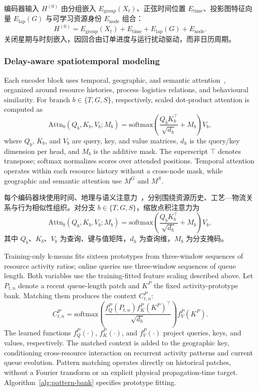 \documentclass[a4paper,fleqn]{cas-dc}
\newcommand{\zhpara}[1]{%
  \par\begingroup\small\color{black!72}\noindent #1\par\endgroup}
\begin{document}
\zhpara{编码器输入 $H^{(0)}$ 由分组嵌入 $E_{\mathrm{group}}(X_t)$、正弦时间位置 $E_{\mathrm{time}}$、投影图特征向量 $E_{\mathrm{lap}}(G)$ 与可学习资源身份 $E_{\mathrm{node}}$ 组合：
\begin{equation}
H^{(0)}=E_{\mathrm{group}}(X_t)+
E_{\mathrm{time}}+E_{\mathrm{lap}}(G)+E_{\mathrm{node}}.
\end{equation}
关闭星期与时刻嵌入，因回合由订单进度与运行扰动驱动，而非日历周期。}


\subsubsection{Delay-aware spatiotemporal modeling}

Each encoder block uses temporal, geographic, and semantic attention~\cite{jiang2023pdformer}, organized around resource histories, process--logistics relations, and behavioural similarity. For branch $b\in\{T,G,S\}$, respectively, scaled dot-product attention is computed as
\begin{equation}
\mathrm{Attn}_{b}(Q_b,K_b,V_b;M_b)
=\mathrm{softmax}\!\left(
\frac{Q_bK_b^\top}{\sqrt{d_h}}+M_b
\right)V_b ,
\end{equation}
where $Q_b$, $K_b$, and $V_b$ are query, key, and value matrices, $d_h$ is the query/key dimension per head, and $M_b$ is the additive mask. The superscript $\top$ denotes transpose; softmax normalizes scores over attended positions. Temporal attention operates within each resource history without a cross-node mask, while geographic and semantic attention use $M^G$ and $M^S$.

\zhpara{每个编码器块使用时间、地理与语义注意力~\cite{jiang2023pdformer}，分别围绕资源历史、工艺—物流关系与行为相似性组织。对分支 $b\in\{T,G,S\}$，缩放点积注意力为
\begin{equation}
\mathrm{Attn}_{b}(Q_b,K_b,V_b;M_b)
=\mathrm{softmax}\!\left(
\frac{Q_bK_b^\top}{\sqrt{d_h}}+M_b
\right)V_b ,
\end{equation}
其中 $Q_b$、$K_b$、$V_b$ 为查询、键与值矩阵，$d_h$ 为查询维，$M_b$ 为分支掩码。}


Training-only k-means fits sixteen prototypes from three-window sequences of resource activity ratios; online queries use three-window sequences of queue length. Both variables use the training-fitted feature scaling described above. Let $P_{t,n}$ denote a recent queue-length patch and $K^P$ the fixed activity-prototype bank. Matching them produces the context $C^P_{t,n}$:
\begin{equation}
C^P_{t,n}=
\mathrm{softmax}\!\left(
\frac{f_Q^P(P_{t,n})f_K^P(K^P)^\top}{\sqrt{d_h}}
\right)f_V^P(K^P).
\end{equation}
The learned functions $f_Q^P(\cdot)$, $f_K^P(\cdot)$, and $f_V^P(\cdot)$ project queries, keys, and values, respectively. The matched context is added to the geographic key, conditioning cross-resource interaction on recurrent activity patterns and current queue evolution. Pattern matching operates directly on historical patches, without a Fourier transform or an explicit physical propagation-time target. Algorithm~\ref{alg:pattern-bank} specifies prototype fitting.
\end{document}
